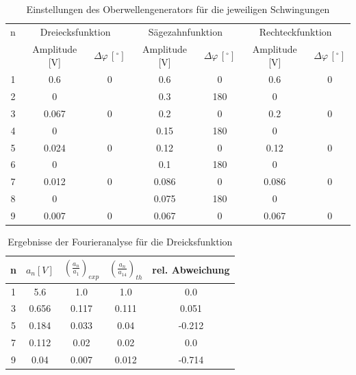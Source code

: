 \documentclass[11pt,ngerman,a4paper]{article}
\begin{document}
\begin{table}
\centering
\begin{tabular}{|c||c|c||c|c||c|c|}
\hline
n & \multicolumn{2}{c||}{Dreiecksfunktion} & \multicolumn{2}{c||}{Sägezahnfunktion} & \multicolumn{2}{c|}{Rechteckfunktion} \\
 & Amplitude [V] & $\Delta \varphi\,[^\circ]$ & Amplitude [V] & $\Delta \varphi\,[^\circ]$ & Amplitude [V] & $\Delta \varphi\,[^\circ]$ \\
\hline
1 & 0.6 & 0 & 0.6 & 0 & 0.6 & 0\\
2 & 0 &  & 0.3 & 180 & 0& \\
3 & 0.067 & 0 & 0.2 & 0 & 0.2 & 0\\
4 & 0 &  & 0.15 & 180 & 0 & \\
5 & 0.024 & 0 & 0.12 & 0 & 0.12 & 0\\
6 & 0 &  & 0.1 & 180 & 0 & \\
7 & 0.012 & 0 & 0.086 & 0 & 0.086 & 0\\
8 & 0 &  & 0.075 & 180 & 0 & \\
9 & 0.007 & 0 & 0.067 & 0 & 0.067 & 0\\
\hline
\end{tabular}
\label{params}
\caption{Einstellungen des Oberwellengenerators für die jeweiligen Schwingungen}
\end{table}
\begin{table}
\centering
\begin{tabular}{|c|c|c|c|c|}
\hline
n & $a_n [V]$ & $(\frac{a_n}{a_1})_{exp}$ & $(\frac{a_n}{a_14})_{th}$ & rel. Abweichung\\
\hline
1&5.6 & 1.0 & 1.0 & 0.0\\
3&0.656 & 0.117 & 0.111 & 0.051\\
5&0.184 & 0.033 & 0.04 & -0.212\\
7&0.112 & 0.02 & 0.02 & 0.0\\
9&0.04 & 0.007 & 0.012 & -0.714\\
\hline
\end{tabular}
\label{hut}
\caption{Ergebnisse der Fourieranalyse für die Dreicksfunktion}
\end{table}
\end{document}
